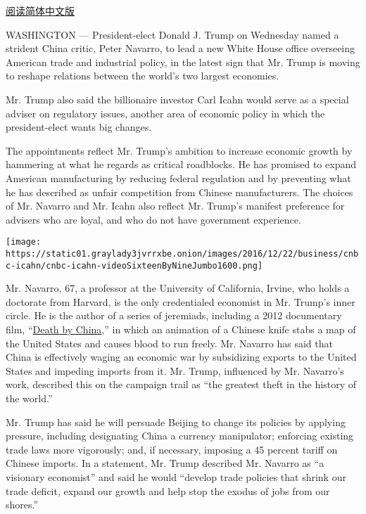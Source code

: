 \href{http://cn.nytimes3xbfgragh.onion/usa/20161222/peter-navarro-carl-icahn-trump-china-trade/}{阅读简体中文版}

WASHINGTON --- President-elect Donald J. Trump on Wednesday named a
strident China critic, Peter Navarro, to lead a new White House office
overseeing American trade and industrial policy, in the latest sign that
Mr. Trump is moving to reshape relations between the world's two largest
economies.

Mr. Trump also said the billionaire investor Carl Icahn would serve as a
special adviser on regulatory issues, another area of economic policy in
which the president-elect wants big changes.

The appointments reflect Mr. Trump's ambition to increase economic
growth by hammering at what he regards as critical roadblocks. He has
promised to expand American manufacturing by reducing federal regulation
and by preventing what he has described as unfair competition from
Chinese manufacturers. The choices of Mr. Navarro and Mr. Icahn also
reflect Mr. Trump's manifest preference for advisers who are loyal, and
who do not have government experience.

\texttt{[image: https://static01.graylady3jvrrxbe.onion/images/2016/12/22/business/cnbc-icahn/cnbc-icahn-videoSixteenByNineJumbo1600.png]}

Mr. Navarro, 67, a professor at the University of California, Irvine,
who holds a doctorate from Harvard, is the only credentialed economist
in Mr. Trump's inner circle. He is the author of a series of jeremiads,
including a 2012 documentary film,
``\href{https://www.youtube.com/watch?v=mMlmjXtnIXI}{Death by China},''
in which an animation of a Chinese knife stabs a map of the United
States and causes blood to run freely. Mr. Navarro has said that China
is effectively waging an economic war by subsidizing exports to the
United States and impeding imports from it. Mr. Trump, influenced by Mr.
Navarro's work, described this on the campaign trail as ``the greatest
theft in the history of the world.''

Mr. Trump has said he will persuade Beijing to change its policies by
applying pressure, including designating China a currency manipulator;
enforcing existing trade laws more vigorously; and, if necessary,
imposing a 45 percent tariff on Chinese imports. In a statement, Mr.
Trump described Mr. Navarro as ``a visionary economist'' and said he
would ``develop trade policies that shrink our trade deficit, expand our
growth and help stop the exodus of jobs from our shores.''

